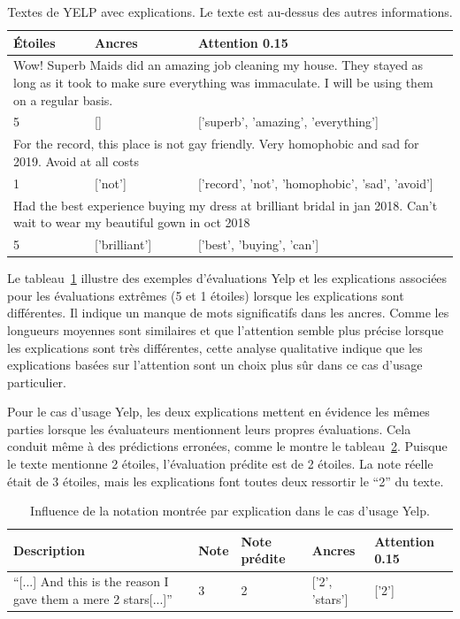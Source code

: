 \begin{table}[htb!p]
\caption{Textes de YELP avec explications. Le texte est au-dessus des autres informations.}\label{qualitative_yelp}
\begin{tabular}{|p{}|p{}|l|}
\cline{1-3}
\textbf{\'Etoiles} & \textbf{Ancres} & \textbf{Attention 0.15} \\ \hline
\multicolumn{3}{|p{0.96\textwidth}|}{Wow!  Superb Maids did an amazing job cleaning my house.  They stayed as long as it took to make sure everything was immaculate.  I will be using them on a regular basis.}\\ \hline
5 & {[}{]}  &   ['superb', 'amazing', 'everything'] \\ \cline{1-3}
\multicolumn{3}{|p{0.96\textwidth}|}{For the record, this place is not gay friendly. Very homophobic and sad for 2019. Avoid at all costs}  \\ \hline
1 & ['not'] & ['record', 'not', 'homophobic', 'sad', 'avoid'] \\ \cline{1-3}
\multicolumn{3}{|p{0.96\textwidth}|}{Had the best experience buying my dress at brilliant bridal in jan 2018. Can't wait to wear my beautiful gown in oct 2018}  \\ \cline{1-3}
5 & ['brilliant']  &  ['best', 'buying', 'can']  \\ \cline{1-3}
\end{tabular}
\end{table}

Le tableau~\ref{qualitative_yelp} illustre des exemples d'évaluations Yelp et les explications associées pour les évaluations extrêmes (5 et 1 étoiles) lorsque les explications sont différentes. Il indique un manque de mots significatifs dans les ancres. Comme les longueurs moyennes sont similaires et que l'attention semble plus précise lorsque les explications sont très différentes, cette analyse qualitative indique que les explications basées sur l'attention sont un choix plus sûr dans ce cas d'usage particulier.

Pour le cas d'usage Yelp, les deux explications mettent en évidence les mêmes parties lorsque les évaluateurs mentionnent leurs propres évaluations. Cela conduit même à des prédictions erronées, comme le montre le tableau~\ref{stars_yelp}. Puisque le texte mentionne 2 étoiles, l'évaluation prédite est de 2 étoiles. La note réelle était de 3 étoiles, mais les explications font toutes deux ressortir le ``2'' du texte.

\begin{table}[h!tpb]
    \centering
\caption{ Influence de la notation montrée par explication dans le cas d’usage Yelp.}\label{stars_yelp}
\begin{tabular}{|p{}|l|p{}|p{}|p{}|}
  \hline
  \textbf{Description} & \textbf{Note} & \textbf{Note prédite} & \textbf{Ancres} & \textbf{Attention 0.15} \\ \hline
  ``[...] And this is the reason I gave them a mere 2 stars[...]'' & 3 & 2 & ['2', 'stars'] & ['2'] \\ \hline
\end{tabular}
\end{table}

